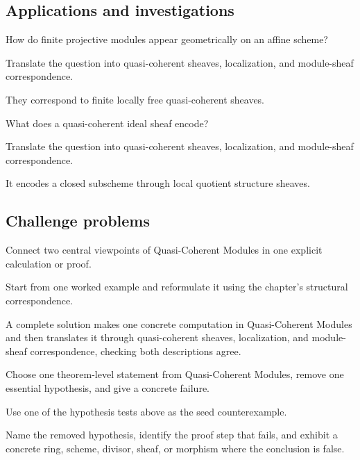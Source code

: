 \subsection*{Applications and investigations}

\begin{exercise}\label{exr:vi33-expand-13}
How do finite projective modules appear geometrically on an affine scheme?
\end{exercise}
\begin{hint}
Translate the question into quasi-coherent sheaves, localization, and module-sheaf correspondence.
\end{hint}
\begin{solution}
They correspond to finite locally free quasi-coherent sheaves.
\end{solution}

\begin{exercise}\label{exr:vi33-expand-14}
What does a quasi-coherent ideal sheaf encode?
\end{exercise}
\begin{hint}
Translate the question into quasi-coherent sheaves, localization, and module-sheaf correspondence.
\end{hint}
\begin{solution}
It encodes a closed subscheme through local quotient structure sheaves.
\end{solution}

\subsection*{Challenge problems}

\begin{exercise}\label{exr:vi33-expand-15}
Connect two central viewpoints of Quasi-Coherent Modules in one explicit calculation or proof.
\end{exercise}
\begin{hint}
Start from one worked example and reformulate it using the chapter's structural correspondence.
\end{hint}
\begin{solution}
A complete solution makes one concrete computation in Quasi-Coherent Modules and then translates it through quasi-coherent sheaves, localization, and module-sheaf correspondence, checking both descriptions agree.
\end{solution}

\begin{exercise}\label{exr:vi33-expand-16}
Choose one theorem-level statement from Quasi-Coherent Modules, remove one essential hypothesis, and give a concrete failure.
\end{exercise}
\begin{hint}
Use one of the hypothesis tests above as the seed counterexample.
\end{hint}
\begin{solution}
Name the removed hypothesis, identify the proof step that fails, and exhibit a concrete ring, scheme, divisor, sheaf, or morphism where the conclusion is false.
\end{solution}


